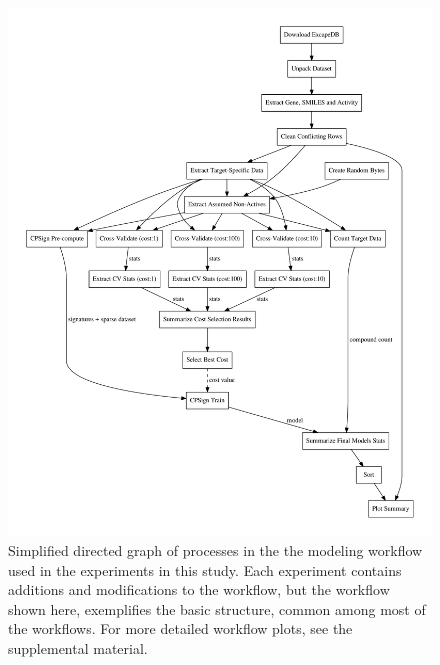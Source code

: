 \documentclass[utf8]{frontiersSCNS} %
\begin{document}
\begin{figure}[h!]
\includegraphics[width=\textwidth]{figures/workflow_graph_clean.pdf}
    \caption{Simplified directed graph of processes in the the modeling workflow used
    in the experiments in this study. Each experiment contains additions and modifications
    to the workflow, but the workflow shown here, exemplifies the basic structure,
    common among most of the workflows. For more detailed workflow
    plots, see the supplemental material.}
    \label{fig:workflow_graph_clean}
\end{figure}
\end{document}
